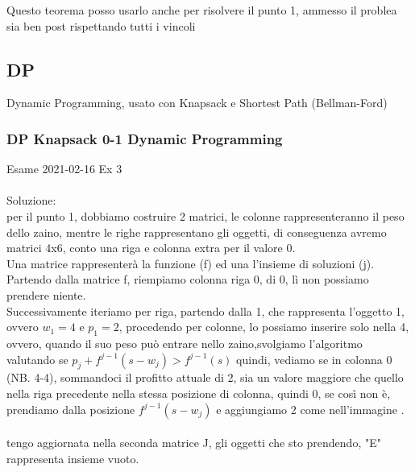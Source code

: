 \documentclass{article}
\begin{document}
Questo teorema posso usarlo anche per risolvere il punto 1, ammesso il problea sia ben post rispettando tutti i vincoli
\newpage
\subsection{DP}
Dynamic Programming, usato con Knapsack e Shortest Path (Bellman-Ford)
\subsubsection{DP Knapsack 0-1 Dynamic Programming}
Esame 2021-02-16 Ex 3\\
\noindent{}%
\\
Soluzione: \\
per il punto 1, dobbiamo costruire 2 matrici, le colonne rappresenteranno il peso dello zaino, mentre le righe rappresentano gli oggetti, di conseguenza avremo matrici 4x6, conto una riga e colonna extra per il valore 0.\\
Una matrice rappresenterà la funzione (f) ed una l'insieme di soluzioni (j).\\
Partendo dalla matrice f, riempiamo colonna riga 0, di 0, lì non possiamo prendere niente.
\\Successivamente iteriamo per riga, partendo dalla 1, che rappresenta l'oggetto 1, ovvero $w_1=4$ e $p_1=2$, procedendo per colonne, lo possiamo inserire solo nella 4, ovvero, quando il suo peso può entrare nello zaino,svolgiamo l'algoritmo valutando se $p_j + f^{j-1}(s-w_j)>f^{j-1}(s)$ quindi, vediamo se in colonna 0 (NB. 4-4), sommandoci il profitto attuale di 2, sia un valore maggiore che quello nella riga precedente nella stessa posizione di colonna, quindi 0, se così non è, prendiamo dalla posizione $f^{j-1}(s-w_j)$ e aggiungiamo 2 come nell'immagine .\\
\\
tengo aggiornata nella seconda matrice J, gli oggetti che sto prendendo, "E" rappresenta insieme vuoto.

\end{document}
